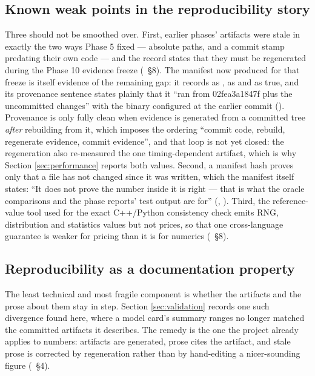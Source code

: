 \documentclass[11pt,a4paper]{article}
\begin{document}
\subsection{Known weak points in the reproducibility story}
Three should not be smoothed over. First, earlier phases' artifacts were stale in exactly the
two ways Phase 5 fixed --- absolute paths, and a commit stamp predating their own code --- and the
record states that they must be regenerated during the Phase 10 evidence freeze
(~\S8). The manifest now produced for that
freeze is itself evidence of the remaining gap: it records  as
,  as  and
 as true, and its provenance sentence states plainly that it
``ran from 02fea3a1847f plus the uncommitted changes'' with the binary configured at the
earlier commit (). Provenance is only fully clean when evidence is generated from a
committed tree \emph{after} rebuilding from it, which imposes the ordering ``commit code,
rebuild, regenerate evidence, commit evidence'', and that loop is not yet closed: the
regeneration also re-measured the one timing-dependent artifact, which is why
Section \ref{sec:performance} reports both values. Second, a manifest hash proves only that a
file has not changed since it was written, which the manifest itself states: ``It does not prove
the number inside it is right --- that is what the oracle comparisons and the phase reports' test
output are for'' (, ). Third, the reference-value tool used for the
exact C++/Python consistency check emits RNG, distribution and statistics values but not prices,
so that one cross-language guarantee is weaker for pricing than it is for numerics
(~\S8).

\subsection{Reproducibility as a documentation property}
The least technical and most fragile component is whether the artifacts and the prose about them
stay in step. Section \ref{sec:validation} records one such divergence found here, where a model
card's summary ranges no longer matched the committed artifacts it describes. The remedy is the
one the project already applies to numbers: artifacts are generated, prose cites the artifact,
and stale prose is corrected by regeneration rather than by hand-editing a nicer-sounding figure
(~\S4).
\end{document}

